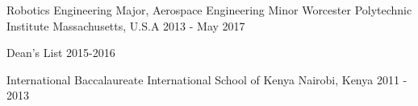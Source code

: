\vspace{-5pt}
\begin{cventries}
  \cventry
    {Robotics Engineering Major, Aerospace Engineering Minor}
    {Worcester Polytechnic Institute}
    {Massachusetts, U.S.A}
    {2013 - May 2017}
    {
      \begin{cvitems}
        \item {Dean's List 2015-2016}\hspace{30pt}
      \end{cvitems}
    }
  \space
  \cventry
    {International Baccalaureate}
    {International School of Kenya}
    {Nairobi, Kenya}
    {2011 - 2013}
    {
    }
\end{cventries}
 